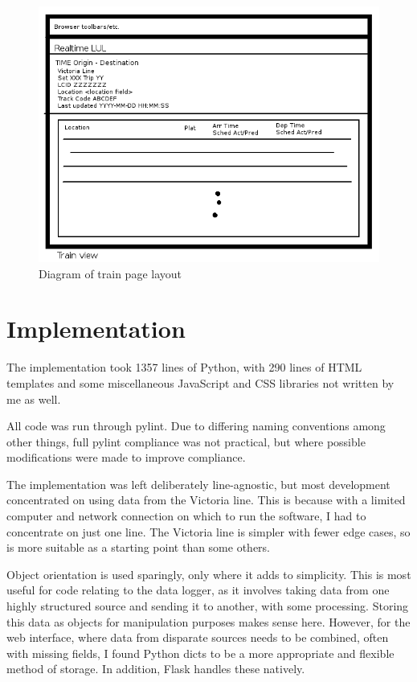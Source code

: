 \documentclass[a4paper,12pt,twoside]{report}
\begin{document}
\begin{figure}[h]
  \centering
  \includegraphics[width=\linewidth]{screen3}
  \caption{Diagram of train page layout}
  \label{fig:screen3}
\end{figure}

\chapter{Implementation}

The implementation took 1357 lines of Python, with 290 lines of HTML templates
and some miscellaneous JavaScript and CSS libraries not written by me as well.

All code was run through pylint. Due to differing naming conventions among
other things, full pylint compliance was not practical, but where possible
modifications were made to improve compliance.

The implementation was left deliberately line-agnostic, but most development
concentrated on using data from the Victoria line. This is because with a
limited computer and network connection on which to run the software, I had to
concentrate on just one line. The Victoria line is simpler with fewer edge
cases, so is more suitable as a starting point than some others.

Object orientation is used sparingly, only where it adds to simplicity. This is
most useful for code relating to the data logger, as it involves taking data
from one highly structured source and sending it to another, with some
processing. Storing this data as objects for manipulation purposes makes sense
here. However, for the web interface, where data from disparate sources needs
to be combined, often with missing fields, I found Python dicts to be a more
appropriate and flexible method of storage. In addition, Flask handles these
natively.
\end{document}
